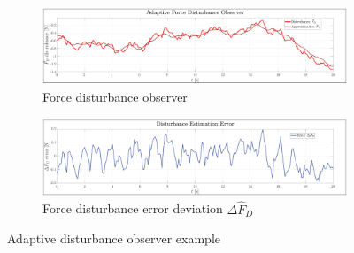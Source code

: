 \begin{figure}[htbp]
\centering
\begin{subfigure}{\textwidth}
\centering
\includegraphics[width=\textwidth]{graphs/disturbance_D}
\vspace{-4pt}
\caption{Force disturbance observer}
\label{fig:disturbance_D}
\end{subfigure}
\begin{subfigure}{\textwidth}
\centering
\includegraphics[width=\textwidth]{graphs/error_DR}
\vspace{-4pt}
\caption{Force disturbance error deviation $\Delta\hat{F}_D$}
\label{fig:error_DR}
\end{subfigure}
\vspace{-6pt}
\caption{Adaptive disturbance observer example}
\label{fig:example_D}
\end{figure}
